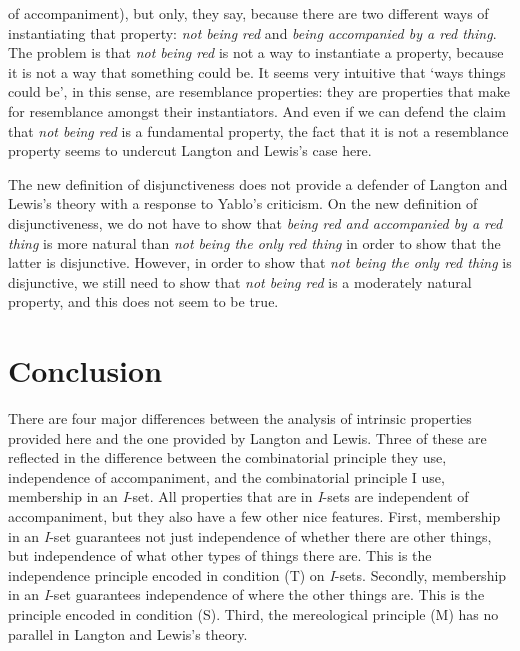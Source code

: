 \documentclass[
  11pt,
  letterpaper,
  DIV=11,
  numbers=noendperiod,
  twoside]{scrartcl}
\begin{document}
of accompaniment), but only, they say, because there are two different
ways of instantiating that property: \emph{not being red} and
\emph{being accompanied by a red thing}. The problem is that \emph{not
being red} is not a way to instantiate a property, because it is not a
way that something could be. It seems very intuitive that `ways things
could be', in this sense, are resemblance properties: they are
properties that make for resemblance amongst their instantiators. And
even if we can defend the claim that \emph{not being red} is a
fundamental property, the fact that it is not a resemblance property
seems to undercut Langton and Lewis's case here.

The new definition of disjunctiveness does not provide a defender of
Langton and Lewis's theory with a response to Yablo's criticism. On the
new definition of disjunctiveness, we do not have to show that
\emph{being red and accompanied by a red thing} is more natural than
\emph{not being the only red thing} in order to show that the latter is
disjunctive. However, in order to show that \emph{not being the only red
thing} is disjunctive, we still need to show that \emph{not being red}
is a moderately natural property, and this does not seem to be true.

\section{Conclusion}\label{conclusion}

There are four major differences between the analysis of intrinsic
properties provided here and the one provided by Langton and Lewis.
Three of these are reflected in the difference between the combinatorial
principle they use, independence of accompaniment, and the combinatorial
principle I use, membership in an \emph{I}-set. All properties that are
in \emph{I}-sets are independent of accompaniment, but they also have a
few other nice features. First, membership in an \emph{I}-set guarantees
not just independence of whether there are other things, but
independence of what other types of things there are. This is the
independence principle encoded in condition (T) on \emph{I}-sets.
Secondly, membership in an \emph{I}-set guarantees independence of where
the other things are. This is the principle encoded in condition (S).
Third, the mereological principle (M) has no parallel in Langton and
Lewis's theory.
\end{document}
